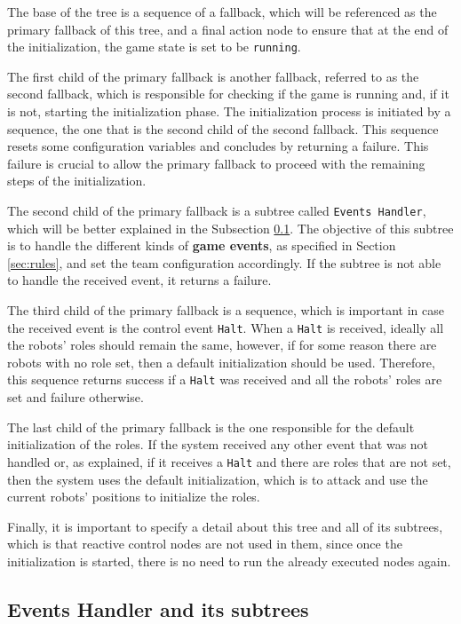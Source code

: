 The base of the tree is a sequence of a fallback, which will be referenced as the primary fallback of this tree, and a final action node to ensure that at the end of the initialization, the game state is set to be \texttt{running}. 

The first child of the primary fallback is another fallback, referred to as the second fallback, which is responsible for checking if the game is running and, if it is not, starting the initialization phase. The initialization process is initiated by a sequence, the one that is the second child of the second fallback. This sequence resets some configuration variables and concludes by returning a failure. This failure is crucial to allow the primary fallback to proceed with the remaining steps of the initialization.

The second child of the primary fallback is a subtree called \texttt{Events Handler}, which will be better explained in the Subsection \ref{subsec:events_handler_spec}. The objective of this subtree is to handle the different kinds of \textbf{game events}, as specified in Section \ref{sec:rules}, and set the team configuration accordingly. If the subtree is not able to handle the received event, it returns a failure.

The third child of the primary fallback is a sequence, which is important in case the received event is the control event \texttt{Halt}. When a \texttt{Halt} is received, ideally all the robots' roles should remain the same, however, if for some reason there are robots with no role set, then a default initialization should be used. Therefore, this sequence returns success if a \texttt{Halt} was received and all the robots' roles are set and failure otherwise.

The last child of the primary fallback is the one responsible for the default initialization of the roles. If the system received any other event that was not handled or, as explained, if it receives a \texttt{Halt} and there are roles that are not set, then the system uses the default initialization, which is to attack and use the current robots' positions to initialize the roles.

Finally, it is important to specify a detail about this tree and all of its subtrees, which is that reactive control nodes are not used in them, since once the initialization is started, there is no need to run the already executed nodes again.

\subsection{Events Handler and its subtrees}
\label{subsec:events_handler_spec}

